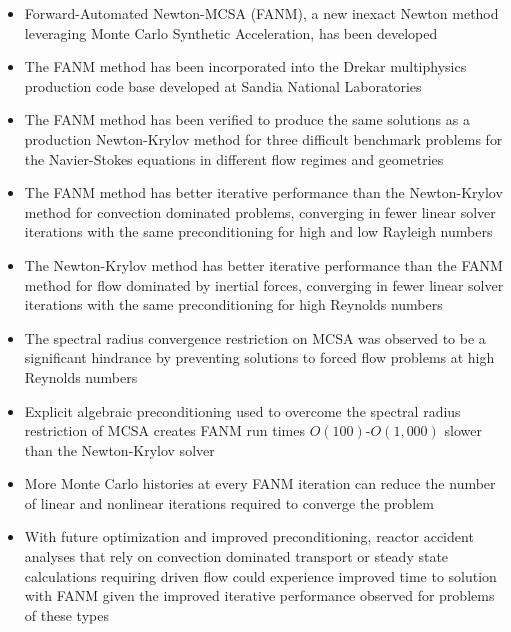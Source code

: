 \begin{itemize}
\item Forward-Automated Newton-MCSA (FANM), a new inexact Newton
  method leveraging Monte Carlo Synthetic Acceleration, has been
  developed
\item The FANM method has been incorporated into the Drekar
  multiphysics production code base developed at Sandia National
  Laboratories
\item The FANM method has been verified to produce the same solutions
  as a production Newton-Krylov method for three difficult benchmark
  problems for the Navier-Stokes equations in different flow regimes
  and geometries
\item The FANM method has better iterative performance than the
  Newton-Krylov method for convection dominated problems, converging
  in fewer linear solver iterations with the same preconditioning for
  high and low Rayleigh numbers
\item The Newton-Krylov method has better iterative performance than
  the FANM method for flow dominated by inertial forces, converging in
  fewer linear solver iterations with the same preconditioning for
  high Reynolds numbers
\item The spectral radius convergence restriction on MCSA was observed
  to be a significant hindrance by preventing solutions to forced flow
  problems at high Reynolds numbers
\item Explicit algebraic preconditioning used to overcome the spectral
  radius restriction of MCSA creates FANM run times
  $O(100)$-$O(1,000)$ slower than the Newton-Krylov solver
\item More Monte Carlo histories at every FANM iteration can reduce
  the number of linear and nonlinear iterations required to converge
  the problem
\item With future optimization and improved preconditioning, reactor
  accident analyses that rely on convection dominated transport or
  steady state calculations requiring driven flow could experience
  improved time to solution with FANM given the improved iterative
  performance observed for problems of these types
\end{itemize}
